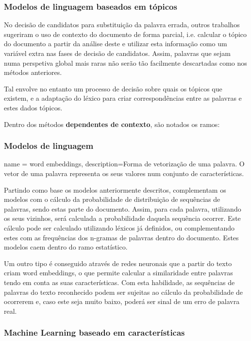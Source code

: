 \subsubsection{Modelos de linguagem baseados em tópicos}
No decisão de candidatos para substituição da palavra errada, outros trabalhos sugeriram o uso de contexto do documento de forma parcial, i.e. calcular o tópico do documento a partir da análise deste e utilizar esta informação como um variável extra nas fases de decisão de candidatos. Assim, palavras que sejam numa perspetiva global mais raras não serão tão facilmente descartadas como nos métodos anteriores.

Tal envolve no entanto um processo de decisão sobre quais os tópicos que existem, e a adaptação do léxico para criar correspondências entre as palavras e estes dados tópicos.

\hspace{10pt}

\par Dentro dos métodos \textbf{dependentes de contexto}, são notados os ramos:

\subsubsection{Modelos de linguagem}
{
name = word embeddings,
description={Forma de vetorização de uma palavra. O vetor de uma palavra representa os seus valores num conjunto de características.}
}

Partindo como base os modelos anteriormente descritos, complementam os modelos com o cálculo da probabilidade de distribuição de sequências de palavras, sendo estas parte do documento. Assim, para cada palavra, utilizando os seus vizinhos, será calculada a probabilidade daquela sequência ocorrer. Este cálculo pode ser calculado utilizando léxicos já definidos, ou complementando estes com as frequências dos n-gramas de palavras dentro do documento. Estes modelos caem dentro do ramo estatístico.

Um outro tipo é conseguido através de redes neuronais que a partir do texto criam \gls{word embeddings}, o que permite calcular a similaridade entre palavras tendo em conta as suas características. Com esta habilidade, as sequências de palavras do texto reconhecido podem ser sujeitas ao cálculo da probabilidade de ocorrerem e, caso este seja muito baixo, poderá ser sinal de um erro de palavra real.

\subsubsection{Machine Learning baseado em características}

